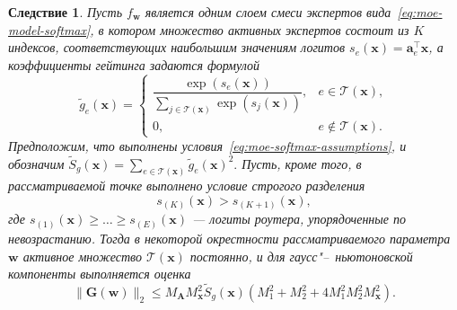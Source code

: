 \documentclass[11pt]{extarticle}
\theoremstyle{definition}
\newcounter{theoremchild}[theorem]
\theoremstyle{plain}
\newtheorem{corollary}[theoremchild]{Следствие}
\theoremstyle{remark}
\begin{document}
\begin{corollary}
\label{cor:moe-topk-G-bound}
Пусть $f_{\mathbf w}$ является одним слоем смеси экспертов вида~\eqref{eq:moe-model-softmax}, в котором множество активных экспертов состоит из $K$ индексов, соответствующих наибольшим значениям логитов
$
s_e(\mathbf x)=\mathbf a_e^\top\mathbf x
$,
а коэффициенты гейтинга задаются формулой
\begin{equation}
    \label{eq:moe-topk-gating}
    \tilde g_e(\mathbf x)=
    \begin{cases}
        \dfrac{\exp(s_e(\mathbf x))}
        {\sum\limits_{j\in\mathcal T(\mathbf x)}\exp(s_j(\mathbf x))},
        & e\in\mathcal T(\mathbf x),\\[1.2ex]
        0, & e\notin\mathcal T(\mathbf x).
    \end{cases}
\end{equation}
Предположим, что выполнены условия~\eqref{eq:moe-softmax-assumptions}, и обозначим
$\tilde S_g(\mathbf x)
=\sum\limits_{e\in\mathcal T(\mathbf x)}\tilde g_e(\mathbf x)^2.$ Пусть, кроме того, в рассматриваемой точке выполнено условие строгого разделения
\begin{equation}
    \label{eq:topk-gap-condition}
    s_{(K)}(\mathbf x)>s_{(K+1)}(\mathbf x),
\end{equation}
где $s_{(1)}(\mathbf x)\ge\dots\ge s_{(E)}(\mathbf x)$ --- логиты роутера, упорядоченные по невозрастанию. Тогда в некоторой окрестности рассматриваемого параметра $\mathbf w$ активное множество $\mathcal T(\mathbf x)$ постоянно, и для гаусс"--~ньютоновской компоненты выполняется оценка
\begin{equation}
    \label{eq:moe-topk-G-bound}
    \|\mathbf G(\mathbf w)\|_2
    \le
    M_{\mathbf A}M_{\mathbf x}^2\tilde S_g(\mathbf x)
    \left(
        M_1^2+M_2^2+4M_1^2M_2^2M_{\mathbf x}^2
    \right).
\end{equation}
\end{corollary}
\end{document}
